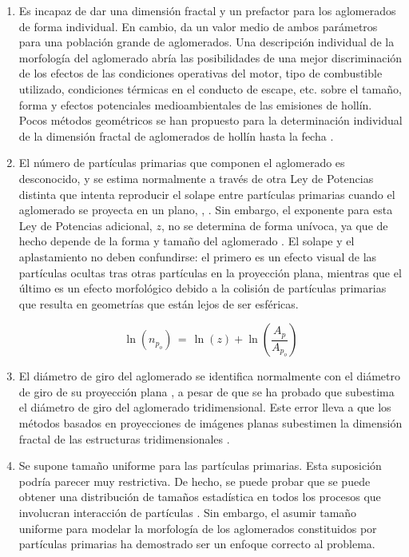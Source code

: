 \begin{enumerate}
	\item Es incapaz de dar una dimensión fractal y un prefactor para los aglomerados de forma individual. En cambio, da un valor medio de ambos parámetros para una población grande de aglomerados. Una descripción individual de la morfología del aglomerado abría las posibilidades de una mejor discriminación de los efectos de las condiciones operativas del motor, tipo de combustible utilizado, condiciones térmicas en el conducto de escape, etc. sobre el tamaño, forma y efectos potenciales medioambientales de las emisiones de hollín. Pocos métodos geométricos se han propuesto para la determinación individual de la dimensión fractal de aglomerados de hollín hasta la fecha \cite{lattuadaetal:2003,lapuertaetal:2006,wozniaketal:2012}.
	\item El número de partículas primarias que componen el aglomerado es desconocido, y se estima normalmente a través de otra Ley de Potencias distinta que intenta reproducir el solape entre partículas primarias cuando el aglomerado se proyecta en un plano, \cite{medaliaetal:1969,megaridisetal:1990}, \cite{brasiletal:1999,leeetal:2003}. Sin embargo, el exponente para esta Ley de Potencias adicional, $z$, no se determina de forma unívoca, ya que de hecho depende de la forma y tamaño del aglomerado \cite{ohetal:1997}. El solape y el aplastamiento no deben confundirse: el primero es un efecto visual de las partículas ocultas tras otras partículas en la proyección plana, mientras que el último es un efecto morfológico debido a la colisión de partículas primarias que resulta en geometrías que están lejos de ser esféricas.
	
	\begin{equation}
	\ln(n_{p_o})\,=\,\ln(z)+\ln(\frac{A_{p}}{A_{p_o}})
	\label{eq:leydepotenciassolape}
	\end{equation}
	
	\item El diámetro de giro del aglomerado se identifica normalmente con el diámetro de giro de su proyección plana \cite{rogaketal:1992,koyluetal:1995,ohetal:1997}, a pesar de que se ha probado que subestima el diámetro de giro del aglomerado tridimensional. Este error lleva a que los métodos basados en proyecciones de imágenes planas subestimen la dimensión fractal de las estructuras tridimensionales \cite{rogaketal:1992,nelsonetal:1990,adachieetal:2007}.
	
	\item Se supone tamaño uniforme para las partículas primarias. Esta suposición podría parecer muy restrictiva. De hecho, se puede probar que se puede obtener una distribución de tamaños estadística en todos los procesos que involucran interacción de partículas \cite{busheletal:1998}. Sin embargo, el asumir tamaño uniforme para modelar la morfología de los aglomerados constituidos por partículas primarias ha demostrado ser un enfoque correcto al problema.
	

\end{enumerate}
